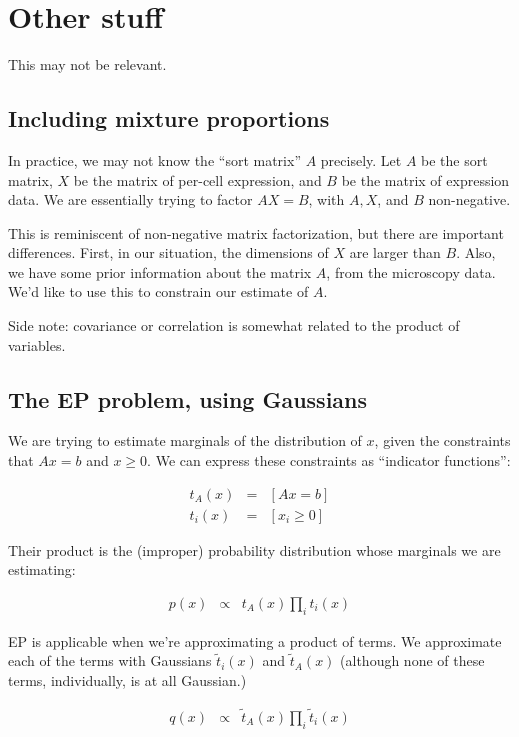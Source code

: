 \documentclass{article}
\begin{document}
\section{Other stuff}

This may not be relevant.

\subsection{Including mixture proportions}

In practice, we may not know the ``sort matrix'' $A$ precisely.
Let $A$ be the sort matrix, $X$ be the matrix of per-cell expression, and
$B$ be the matrix of expression data. We are essentially trying to factor
$AX=B$, with $A, X$, and $B$ non-negative.

This is reminiscent of non-negative matrix factorization, but
there are important differences. First, in our situation,
the dimensions of $X$ are larger than $B$. Also, we have some
prior information about
the matrix $A$, from the microscopy data.
We'd like to use this to constrain our estimate of $A$.

Side note: covariance or correlation is somewhat related to
the product of variables.

\subsection{The EP problem, using Gaussians}

We are trying to estimate marginals of the distribution of $x$, given the
constraints that $Ax = b$ and $x \ge 0$. We can express these constraints
as ``indicator functions'':

\begin{eqnarray}
t_A(x) & = & [Ax = b] \\
t_i(x) & = & [x_i \ge 0]
\end{eqnarray}

Their product is the (improper) probability distribution whose marginals
we are estimating:

\begin{eqnarray}
p(x) & \propto & t_A(x) \prod_i t_i(x)
\end{eqnarray}

EP is applicable when we're approximating a product of terms. We approximate each of the terms with
Gaussians
$\tilde{t}_i(x)$ and $\tilde{t}_A(x)$ (although none of these
terms, individually, is at all Gaussian.) 

\begin{eqnarray}
q(x) & \propto & \tilde{t}_A(x) \prod_i \tilde{t}_i(x)
\end{eqnarray}
\end{document}
